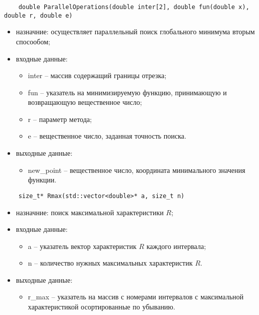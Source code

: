 \documentclass{report}
\begin{document}
\begin{lstlisting}
    double ParallelOperations(double inter[2], double fun(double x), double r, double e)
\end{lstlisting}
\begin{itemize}
    \item назначние: осуществляет параллельный поиск глобального минимума вторым спосообом;
    \item входные данные:
        \begin{itemize}	
            \item inter – массив содержащий границы отрезка;
            \item fun – указатель на минимизируемую функцию, принимающую и возвращающую вещественное число;
            \item r – параметр метода;
            \item e – вещественное число, заданная точность поиска.
        \end{itemize}
    \item выходные данные:
        \begin{itemize}
            \item new\_point – вещественное число, координата минимального значения функции.
        \end{itemize}
\end{itemize}

\begin{lstlisting}
    size_t* Rmax(std::vector<double>* a, size_t n) 
\end{lstlisting}
\begin{itemize}
    \item назначние: поиск максимальной характеристики $R$;
    \item входные данные:
        \begin{itemize}	
            \item a – указатель вектор характеристик $R$ каждого интервала;
            \item n – количество нужных максимальных характеристик $R$.
        \end{itemize}
    \item выходные данные:
        \begin{itemize}
        	\item r\_max – указатель на массив с номерами интервалов с максимальной характеристикой осортированные по убыванию.
        \end{itemize}
\end{itemize}
\end{document}
